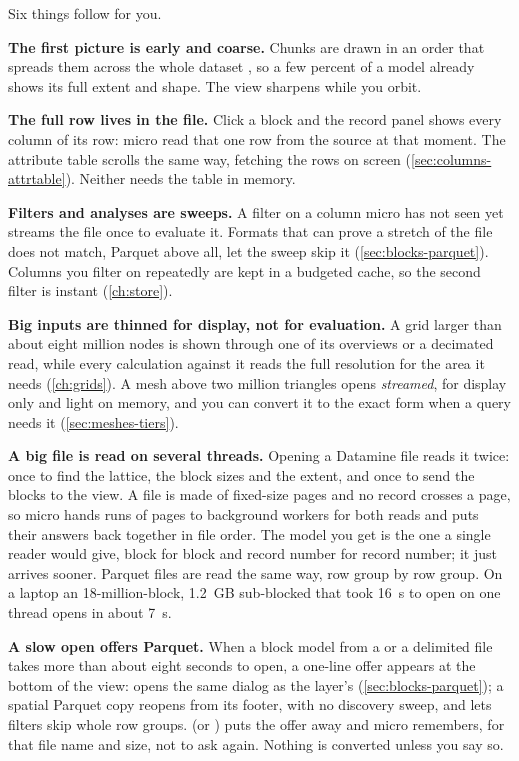 Six things follow for you.

\textbf{The first picture is early and coarse.} Chunks are drawn in an order that spreads them across the whole dataset \parencite{schutz2020}, so a few percent of a model already shows its full extent and shape. The view sharpens while you orbit.

\textbf{The full row lives in the file.} Click a block and the record panel shows every column of its row: micro read that one row from the source at that moment. The attribute table scrolls the same way, fetching the rows on screen (\cref{sec:columns-attrtable}). Neither needs the table in memory.

\textbf{Filters and analyses are sweeps.} A filter on a column micro has not seen yet streams the file once to evaluate it. Formats that can prove a stretch of the file does not match, Parquet above all, let the sweep skip it (\cref{sec:blocks-parquet}). Columns you filter on repeatedly are kept in a budgeted cache, so the second filter is instant (\cref{ch:store}).

\textbf{Big inputs are thinned for display, not for evaluation.} A grid larger than about eight million nodes is shown through one of its overviews or a decimated read, while every calculation against it reads the full resolution for the area it needs (\cref{ch:grids}). A mesh above two million triangles opens \emph{streamed}, for display only and light on memory, and you can convert it to the exact form when a query needs it (\cref{sec:meshes-tiers}).

\textbf{A big file is read on several threads.} Opening a Datamine  file reads it twice: once to find the lattice, the block sizes and the extent, and once to send the blocks to the view. A  file is made of fixed-size pages and no record crosses a page, so micro hands runs of pages to background workers for both reads and puts their answers back together in file order. The model you get is the one a single reader would give, block for block and record number for record number; it just arrives sooner. Parquet files are read the same way, row group by row group. On a laptop an 18-million-block, 1.2~GB sub-blocked  that took 16~s to open on one thread opens in about 7~s.

\textbf{A slow open offers Parquet.} When a block model from a  or a delimited file takes more than about eight seconds to open, a one-line offer appears at the bottom of the view:   opens the same dialog as the layer's  (\cref{sec:blocks-parquet}); a spatial Parquet copy reopens from its footer, with no discovery sweep, and lets filters skip whole row groups.  (or ) puts the offer away and micro remembers, for that file name and size, not to ask again. Nothing is converted unless you say so.

